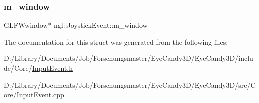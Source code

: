 \subsubsection{\texorpdfstring{m\+\_\+window}{m\_window}}
{\footnotesize\ttfamily G\+L\+F\+Wwindow$\ast$ ngl\+::\+Joystick\+Event\+::m\+\_\+window}



The documentation for this struct was generated from the following files\+:\begin{DoxyCompactItemize}
\item 
D\+:/\+Library/\+Documents/\+Job/\+Forschungsmaster/\+Eye\+Candy3\+D/\+Eye\+Candy3\+D/include/\+Core/\mbox{\hyperlink{_input_event_8h}{Input\+Event.\+h}}\item 
D\+:/\+Library/\+Documents/\+Job/\+Forschungsmaster/\+Eye\+Candy3\+D/\+Eye\+Candy3\+D/src/\+Core/\mbox{\hyperlink{_input_event_8cpp}{Input\+Event.\+cpp}}\end{DoxyCompactItemize}
